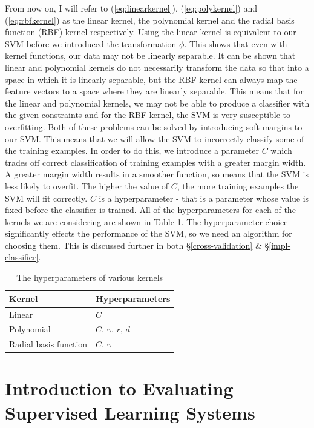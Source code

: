 \documentclass[12pt,a4paper,twoside,openright]{report}
\begin{document}
From now on, I will refer to (\ref{eq:linearkernel}), (\ref{eq:polykernel}) and (\ref{eq:rbfkernel}) as the linear kernel, the polynomial kernel and the radial basis function (RBF) kernel respectively. Using the linear kernel is equivalent to our SVM before we introduced the transformation $\phi$. This shows that even with kernel functions, our data may not be linearly separable. It can be shown that linear and polynomial kernels do not necessarily transform the data so that into a space in which it is linearly separable, but the RBF kernel can always map the feature vectors to a space where they are linearly separable. This means that for the linear and polynomial kernels, we may not be able to produce a classifier with the given constraints and for the RBF kernel, the SVM is very susceptible to overfitting. Both of these problems can be solved by introducing soft-margins to our SVM. This means that we will allow the SVM to incorrectly classify some of the training examples. In order to do this, we introduce a parameter $C$ which trades off correct classification of training examples with a greater margin width. A greater margin width results in a smoother function, so means that the SVM is less likely to overfit. The higher the value of $C$, the more training examples the SVM will fit correctly. $C$ is a hyperparameter - that is a parameter whose value is fixed before the classifier is trained. All of the hyperparameters for each of the kernels we are considering are shown in Table \ref{table:hyperparameters}. The hyperparameter choice significantly effects the performance of the SVM, so we need an algorithm for choosing them. This is discussed further in both \S\ref{cross-validation} \& \S\ref{impl-classifier}.
\FloatBarrier
\begin{table}[]
	\centering
	\label{table:hyperparameters}
	\begin{tabular}{ll}
		\textbf{Kernel}       & \textbf{Hyperparameters} \\ \hline
		Linear                & $C$                      \\
		Polynomial            & $C$, $\gamma$, $r$, $d$  \\
		Radial basis function & $C$, $\gamma$             
	\end{tabular}
	\caption{The hyperparameters of various kernels}
\end{table}
\FloatBarrier
\section{Introduction to Evaluating Supervised Learning Systems} \label{prep-eval}
\end{document}
